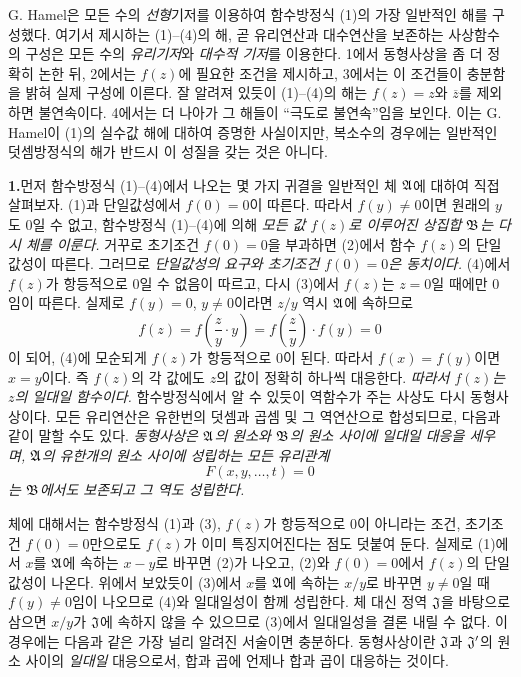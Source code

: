 G. Hamel은 모든 수의 \emph{선형}기저를 이용하여 함수방정식 (1)의 가장 일반적인 해를 구성했다. 여기서 제시하는 (1)--(4)의 해, 곧 유리연산과 대수연산을 보존하는 사상함수의 구성은 모든 수의 \emph{유리기저}와 \emph{대수적 기저}를 이용한다. 1에서 동형사상을 좀 더 정확히 논한 뒤, 2에서는 \(f(z)\)에 필요한 조건을 제시하고, 3에서는 이 조건들이 충분함을 밝혀 실제 구성에 이른다. 잘 알려져 있듯이 (1)--(4)의 해는 \(f(z)=z\)와 \(\overline z\)를 제외하면 불연속이다. 4에서는 더 나아가 그 해들이 ``극도로 불연속''임을 보인다. 이는 G. Hamel이 (1)의 실수값 해에 대하여 증명한 사실이지만, 복소수의 경우에는 일반적인 덧셈방정식의 해가 반드시 이 성질을 갖는 것은 아니다.

\medskip
\noindent\textbf{1.}\quad 먼저 함수방정식 (1)--(4)에서 나오는 몇 가지 귀결을 일반적인 체 \(\mathfrak A\)에 대하여 직접 살펴보자. (1)과 단일값성에서 \(f(0)=0\)이 따른다. 따라서 \(f(y)\ne0\)이면 원래의 \(y\)도 0일 수 없고, 함수방정식 (1)--(4)에 의해 \emph{모든 값 \(f(z)\)로 이루어진 상집합 \(\mathfrak B\)는 다시 체를 이룬다.} 거꾸로 초기조건 \(f(0)=0\)을 부과하면 (2)에서 함수 \(f(z)\)의 단일값성이 따른다. 그러므로 \emph{단일값성의 요구와 초기조건 \(f(0)=0\)은 동치이다.} (4)에서 \(f(z)\)가 항등적으로 0일 수 없음이 따르고, 다시 (3)에서 \(f(z)\)는 \(z=0\)일 때에만 0임이 따른다. 실제로 \(f(y)=0\), \(y\ne0\)이라면 \(z/y\) 역시 \(\mathfrak A\)에 속하므로
\[
f(z)=f\!\left(\frac{z}{y}\cdot y\right)=f\!\left(\frac{z}{y}\right)\cdot f(y)=0
\]
이 되어, (4)에 모순되게 \(f(z)\)가 항등적으로 0이 된다. 따라서 \(f(x)=f(y)\)이면 \(x=y\)이다. 즉 \(f(z)\)의 각 값에도 \(z\)의 값이 정확히 하나씩 대응한다. \emph{따라서 \(f(z)\)는 \(z\)의 일대일 함수이다.} 함수방정식에서 알 수 있듯이 역함수가 주는 사상도 다시 동형사상이다. 모든 유리연산은 유한번의 덧셈과 곱셈 및 그 역연산으로 합성되므로, 다음과 같이 말할 수도 있다. \emph{동형사상은 \(\mathfrak A\)의 원소와 \(\mathfrak B\)의 원소 사이에 일대일 대응을 세우며, \(\mathfrak A\)의 유한개의 원소 사이에 성립하는 모든 유리관계}
\[
F(x,y,\ldots,t)=0
\]
\emph{는 \(\mathfrak B\)에서도 보존되고 그 역도 성립한다.}

체에 대해서는 함수방정식 (1)과 (3), \(f(z)\)가 항등적으로 0이 아니라는 조건, 초기조건 \(f(0)=0\)만으로도 \(f(z)\)가 이미 특징지어진다는 점도 덧붙여 둔다. 실제로 (1)에서 \(x\)를 \(\mathfrak A\)에 속하는 \(x-y\)로 바꾸면 (2)가 나오고, (2)와 \(f(0)=0\)에서 \(f(z)\)의 단일값성이 나온다. 위에서 보았듯이 (3)에서 \(x\)를 \(\mathfrak A\)에 속하는 \(x/y\)로 바꾸면 \(y\ne0\)일 때 \(f(y)\ne0\)임이 나오므로 (4)와 일대일성이 함께 성립한다. 체 대신 정역 \(\mathfrak J\)을 바탕으로 삼으면 \(x/y\)가 \(\mathfrak J\)에 속하지 않을 수 있으므로 (3)에서 일대일성을 결론 내릴 수 없다. 이 경우에는 다음과 같은 가장 널리 알려진 서술이면 충분하다. 동형사상이란 \(\mathfrak J\)과 \(\mathfrak J'\)의 원소 사이의 \emph{일대일} 대응으로서, 합과 곱에 언제나 합과 곱이 대응하는 것이다.

